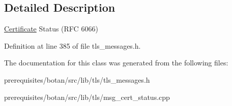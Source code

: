 \subsection{Detailed Description}
\mbox{\hyperlink{class_botan_1_1_t_l_s_1_1_certificate}{Certificate}} Status (R\+FC 6066) 

Definition at line 385 of file tls\+\_\+messages.\+h.



The documentation for this class was generated from the following files\+:\begin{DoxyCompactItemize}
\item 
prerequisites/botan/src/lib/tls/tls\+\_\+messages.\+h\item 
prerequisites/botan/src/lib/tls/msg\+\_\+cert\+\_\+status.\+cpp\end{DoxyCompactItemize}
